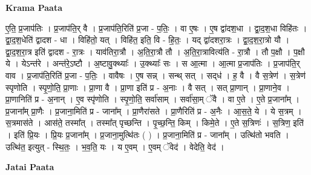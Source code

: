 \documentclass[17pt]{extarticle}
\begin{document}
\textbf{Krama Paata} \newline

ए॒ति॒ प्र॒जाप॑तिः । प्र॒जाप॑ति॒र् वै । प्र॒जाप॑ति॒रिति॑ प्र॒जा - प॒तिः॒ । वा ए॒षः । ए॒ष द्वा॑दश॒धा । द्वा॒द॒श॒धा विहि॑तः । द्वा॒द॒श॒धेति॑ द्वादश - धा । विहि॑तो॒ यत् । विहि॑त॒ इति॒ वि - हि॒तः॒ । यद् द्वा॑दशरा॒त्रः । द्वा॒द॒श॒रा॒त्रो यौ । द्वा॒द॒श॒रा॒त्र इति॑ द्वादश - रा॒त्रः । याव॑तिरा॒त्रौ । अ॒ति॒रा॒त्रौ तौ । अ॒ति॒रा॒त्रावित्य॑ति - रा॒त्रौ । तौ प॒क्षौ । प॒क्षौ ये । येऽन्त॑रे । अन्त॑रे॒ऽष्टौ । अ॒ष्टावु॒क्थ्याः᳚ । उ॒क्थ्याः᳚ सः । स आ॒त्मा । आ॒त्मा प्र॒जाप॑तिः । प्र॒जाप॑ति॒र् वाव । प्र॒जाप॑ति॒रिति॑ प्र॒जा - प॒तिः॒ । वावैषः । ए॒ष सन्न् । सन्थ् सत् । सद्‌ध॑ । ह॒ वै । वै स॒त्रेण॑ । स॒त्रेण॑ स्पृणोति । स्पृ॒णो॒ति॒ प्रा॒णाः । प्रा॒णा वै । प्रा॒णा इति॑ प्र - अ॒नाः । वै सत् । सत् प्रा॒णान् । प्रा॒णाने॒व । प्रा॒णानिति॑ प्र - अ॒नान् । ए॒व स्पृ॑णोति । स्पृ॒णो॒ति॒ सर्वा॑साम् । सर्वा॑सा॒म् ॅवै । वा ए॒ते । ए॒ते प्र॒जाना᳚म् । प्र॒जाना᳚म् प्रा॒णैः । प्र॒जाना॒मिति॑ प्र - जाना᳚म् । प्रा॒णैरा॑सते । प्रा॒णैरिति॑ प्र - अ॒नैः । आ॒स॒ते॒ ये । ये स॒त्रम् । स॒त्रमास॑ते । आस॑ते॒ तस्मा᳚त् । तस्मा᳚त् पृच्छन्ति । पृ॒च्छ॒न्ति॒ किम् । किमे॒ते । ए॒ते स॒त्रिणः॑ । स॒त्रिण॒ इति॑ । इति॑ प्रि॒यः । प्रि॒यः प्र॒जाना᳚म् । प्र॒जाना॒मुत्थि॑तः ( ) । प्र॒जाना॒मिति॑ प्र - जाना᳚म् । उत्थि॑तो भवति । उत्थि॑त॒ इत्युत् - स्थि॒तः॒ । भ॒व॒ति॒ यः । य ए॒वम् । ए॒वम् ॅवेद॑ । वेदेति॒ वेद॑ । \newline

\textbf{Jatai Paata} \newline
\end{document}
